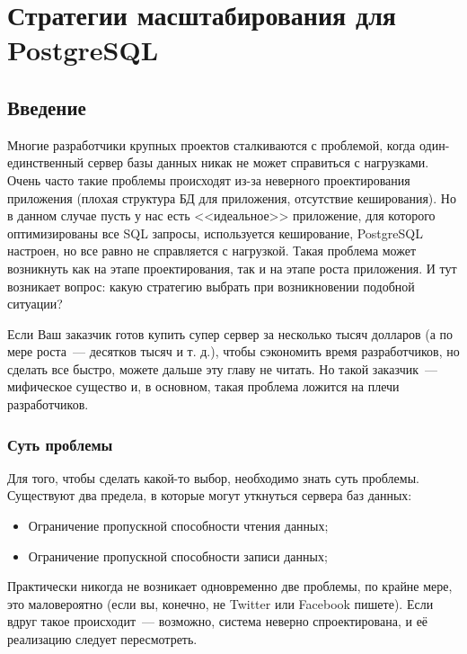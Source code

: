 \chapter{Стратегии масштабирования для PostgreSQL}

\begin{epigraphs}
\end{epigraphs}

\section{Введение}

Многие разработчики крупных проектов сталкиваются с проблемой, когда один-единственный сервер базы данных никак не может справиться с нагрузками. Очень часто такие проблемы происходят из-за неверного проектирования приложения (плохая структура БД для приложения, отсутствие кеширования). Но в данном случае пусть у нас есть <<идеальное>> приложение, для которого оптимизированы все SQL запросы, используется кеширование, PostgreSQL настроен, но все равно не справляется с нагрузкой. Такая проблема может возникнуть как на этапе проектирования, так и на этапе роста приложения. И тут возникает вопрос: какую стратегию выбрать при возникновении подобной ситуации?

Если Ваш заказчик готов купить супер сервер за несколько тысяч долларов (а по мере роста~--- десятков тысяч и т. д.), чтобы сэкономить время разработчиков, но сделать все быстро, можете дальше эту главу не читать. Но такой заказчик~--- мифическое существо и, в основном, такая проблема ложится на плечи разработчиков.

\subsection{Суть проблемы}

Для того, чтобы сделать какой-то выбор, необходимо знать суть проблемы. Существуют два предела, в которые могут уткнуться сервера баз данных:

\begin{itemize}
  \item Ограничение пропускной способности чтения данных;
  \item Ограничение пропускной способности записи данных;
\end{itemize}

Практически никогда не возникает одновременно две проблемы, по крайне мере, это маловероятно (если вы, конечно, не Twitter или Facebook пишете). Если вдруг такое происходит~--- возможно, система неверно спроектирована, и её реализацию следует пересмотреть.

